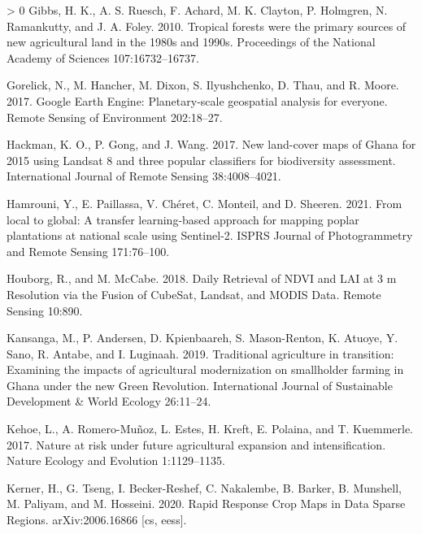 \documentclass[11pt,a4paper]{article}
\newlength{\cslhangindent}
\newenvironment{CSLReferences}[3] %
 {%
  \setlength{\parindent}{0pt}
  \ifodd #1 \everypar{\setlength{\hangindent}{\cslhangindent}}\ignorespaces\fi
  \ifnum #2 > 0
  \setlength{\parskip}{#2\baselineskip}
  \fi
 }%
 {}
\begin{document}
\begin{CSLReferences}{1}{0}
\leavevmode\hypertarget{ref-GibbsTropicalforestswere2010}{}%
Gibbs, H. K., A. S. Ruesch, F. Achard, M. K. Clayton, P. Holmgren, N.
Ramankutty, and J. A. Foley. 2010. Tropical forests were the primary
sources of new agricultural land in the 1980s and 1990s. Proceedings of
the National Academy of Sciences 107:16732--16737.

\leavevmode\hypertarget{ref-GorelickGoogleEarthEngine2017}{}%
Gorelick, N., M. Hancher, M. Dixon, S. Ilyushchenko, D. Thau, and R.
Moore. 2017. Google {Earth Engine}: Planetary-scale geospatial analysis
for everyone. Remote Sensing of Environment 202:18--27.

\leavevmode\hypertarget{ref-hackmanNewLandcoverMaps2017}{}%
Hackman, K. O., P. Gong, and J. Wang. 2017. New land-cover maps of
{Ghana} for 2015 using {Landsat} 8 and three popular classifiers for
biodiversity assessment. International Journal of Remote Sensing
38:4008--4021.

\leavevmode\hypertarget{ref-hamrouniLocalGlobalTransfer2021}{}%
Hamrouni, Y., E. Paillassa, V. Chéret, C. Monteil, and D. Sheeren. 2021.
From local to global: A transfer learning-based approach for mapping
poplar plantations at national scale using {Sentinel}-2. ISPRS Journal
of Photogrammetry and Remote Sensing 171:76--100.

\leavevmode\hypertarget{ref-HouborgDailyRetrievalNDVI2018}{}%
Houborg, R., and M. McCabe. 2018. Daily {Retrieval} of {NDVI} and {LAI}
at 3 m {Resolution} via the {Fusion} of {CubeSat}, {Landsat}, and {MODIS
Data}. Remote Sensing 10:890.

\leavevmode\hypertarget{ref-KansangaTraditionalagriculturetransition2019}{}%
Kansanga, M., P. Andersen, D. Kpienbaareh, S. Mason-Renton, K. Atuoye,
Y. Sano, R. Antabe, and I. Luginaah. 2019. Traditional agriculture in
transition: Examining the impacts of agricultural modernization on
smallholder farming in {Ghana} under the new {Green Revolution}.
International Journal of Sustainable Development \& World Ecology
26:11--24.

\leavevmode\hypertarget{ref-kehoeNatureRiskFuture2017}{}%
Kehoe, L., A. Romero-Muñoz, L. Estes, H. Kreft, E. Polaina, and T.
Kuemmerle. 2017. Nature at risk under future agricultural expansion and
intensification. Nature Ecology and Evolution 1:1129--1135.

\leavevmode\hypertarget{ref-kernerRapidResponseCrop2020}{}%
Kerner, H., G. Tseng, I. Becker-Reshef, C. Nakalembe, B. Barker, B.
Munshell, M. Paliyam, and M. Hosseini. 2020. Rapid {Response Crop Maps}
in {Data Sparse Regions}. arXiv:2006.16866 {[}cs, eess{]}.


\end{CSLReferences}
\end{document}
